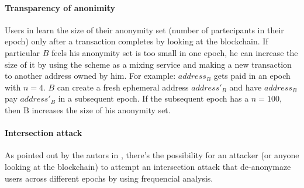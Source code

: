 \paragraph{Transparency of anonimity} Users in learn the size of their anonymity
set (number of partecipants in their epoch) only after a transaction completes
by looking at the blockchain.  If particular $B$ feels his anonymity set is too
small in one epoch, he can increase the size of it by using the scheme as  a
mixing service and making a new transaction to another address owned by him. For
example:  $address_B$ gets paid in an epoch with $n = 4$. $B$ can create a fresh
ephemeral address $address'_B$ and have $address_B$ pay $address'_B$ in a
subsequent epoch. If the subsequent epoch has a $n = 100$, then B increases the
size of his anonymity set.

\paragraph{Intersection attack} As pointed out by the autors in
\cite{heilman-blindly-signed-contracts}, there's the possibility for an attacker
(or anyone looking at the blockchain) to attempt an intersection attack that
de-anonymaze users across different epochs by using frequencial analysis.
